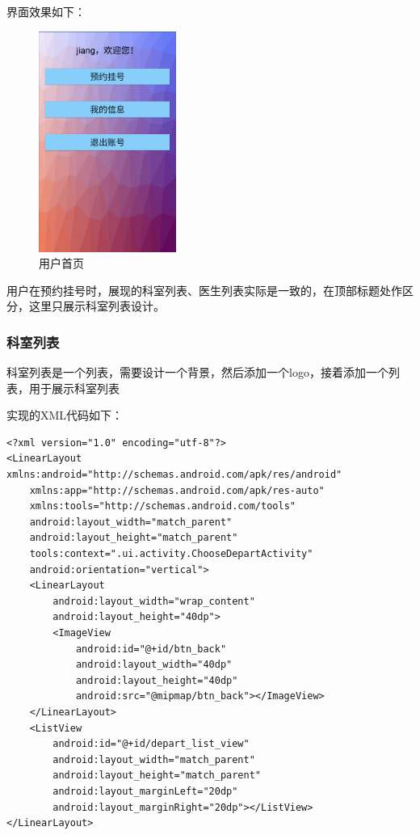 \documentclass[UTF8,12pt]{article}
\begin{document}
界面效果如下：

\begin{figure}[htbp]
    \centering
    \includegraphics[width=0.4\textwidth]{imgs/13.png}
    \caption{用户首页}
\end{figure}

用户在预约挂号时，展现的科室列表、医生列表实际是一致的，在顶部标题处作区分，这里只展示科室列表设计。

\subsubsection{科室列表}
科室列表是一个列表，需要设计一个背景，然后添加一个logo，接着添加一个列表，用于展示科室列表

实现的XML代码如下：

\newpage

\begin{lstlisting}
<?xml version="1.0" encoding="utf-8"?>
<LinearLayout xmlns:android="http://schemas.android.com/apk/res/android"
    xmlns:app="http://schemas.android.com/apk/res-auto"
    xmlns:tools="http://schemas.android.com/tools"
    android:layout_width="match_parent"
    android:layout_height="match_parent"
    tools:context=".ui.activity.ChooseDepartActivity"
    android:orientation="vertical">
    <LinearLayout
        android:layout_width="wrap_content"
        android:layout_height="40dp">
        <ImageView
            android:id="@+id/btn_back"
            android:layout_width="40dp"
            android:layout_height="40dp"
            android:src="@mipmap/btn_back"></ImageView>
    </LinearLayout>
    <ListView
        android:id="@+id/depart_list_view"
        android:layout_width="match_parent"
        android:layout_height="match_parent"
        android:layout_marginLeft="20dp"
        android:layout_marginRight="20dp"></ListView>
</LinearLayout>
\end{lstlisting}
\end{document}
